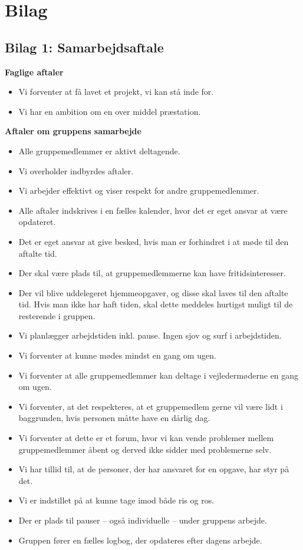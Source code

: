\chapter{Bilag}\label{kapitel_Bilag}
\clearpage


\section{Bilag 1: Samarbejdsaftale}\label{bilag1}
\textbf{Faglige aftaler}
\begin{itemize}
    \item Vi forventer at få lavet et projekt, vi kan stå inde for.
    \item Vi har en ambition om en over middel præstation.
\end{itemize}


\textbf{Aftaler om gruppens samarbejde}
\begin{itemize}
    \item Alle gruppemedlemmer er aktivt deltagende.
    \item Vi overholder indbyrdes aftaler.
    \item Vi arbejder effektivt og viser respekt for andre gruppemedlemmer.
    \item Alle aftaler indskrives i en fælles kalender, hvor det er eget ansvar at være opdateret.
    \item Det er eget ansvar at give besked, hvis man er forhindret i at møde til den aftalte tid.
    \item Der skal være plads til, at gruppemedlemmerne kan have fritidsinteresser.
    \item Der vil blive uddelegeret hjemmeopgaver, og disse skal laves til den aftalte tid.
    Hvis man ikke har haft tiden, skal dette meddeles hurtigst muligt til de resterende i gruppen.
    \item Vi planlægger arbejdstiden inkl. pause. Ingen sjov og surf i arbejdstiden.
    \item Vi forventer at kunne mødes mindst en gang om ugen.
    \item Vi forventer at alle gruppemedlemmer kan deltage i vejledermøderne en gang om ugen.
    \item Vi forventer, at det respekteres, at et gruppemedlem gerne vil være lidt i baggrunden, hvis personen måtte have en dårlig dag.
    \item Vi forventer at dette er et forum, hvor vi kan vende problemer mellem gruppemedlemmer åbent og derved ikke sidder med problemerne selv.
    \item Vi har tillid til, at de personer, der har ansvaret for en opgave, har styr på det.
    \item Vi er indstillet på at kunne tage imod både ris og ros.
    \item Der er plads til pauser – også individuelle – under gruppens arbejde.
    \item Gruppen fører en fælles logbog, der opdateres efter dagens arbejde.
\end{itemize}


